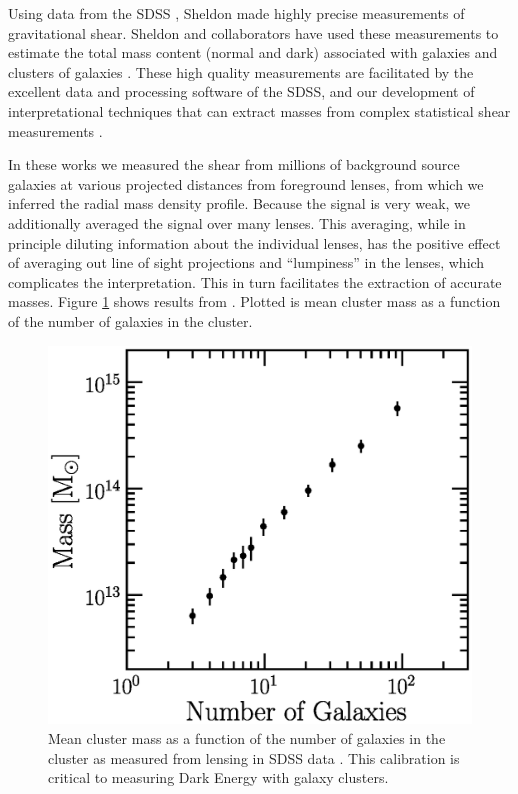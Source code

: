 \documentclass[12pt]{article}
\begin{document}
Using data from the SDSS \cite{York00}, Sheldon made highly precise
measurements of gravitational shear. Sheldon and collaborators have used these
measurements to estimate the total mass content (normal and dark) associated
with galaxies and clusters of galaxies
\cite{fis00,Sheldon04,SheldonLensing07,JohnstonLensing07,SheldonM2L07}.  These
high quality measurements are facilitated by the excellent data and processing
software of the SDSS, and our development of interpretational techniques that
can extract masses from complex statistical shear measurements
\cite{JohnstonInvert07}.

In these works we measured the shear from millions of background source
galaxies at various projected distances from foreground lenses, from which we
inferred the radial mass density profile.  Because the signal is very weak, we
additionally averaged the signal over many lenses.  This averaging, while in
principle diluting information about the individual lenses, has the positive
effect of averaging out line of sight projections and ``lumpiness'' in the
lenses, which complicates the interpretation.  This in turn facilitates the
extraction of accurate masses.  Figure \ref{fig:massngals} shows results from
\cite{SheldonLensing07,JohnstonLensing07}. Plotted is mean cluster mass as a
function of the number of galaxies in the cluster.  

\begin{figure}[p]
\centering
\includegraphics[scale=0.7]{mass-rich-plot.eps}
\caption{Mean cluster mass as a function of the number of
galaxies in the cluster as measured from lensing in SDSS
data \cite{SheldonLensing07,JohnstonLensing07}. This calibration
is critical to measuring Dark Energy with galaxy clusters.\label{fig:massngals}}
\end{figure}
\end{document}
